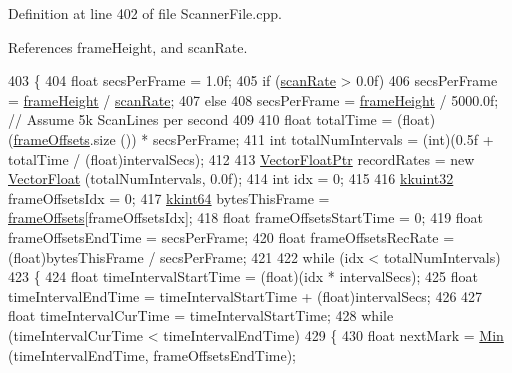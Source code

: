 Definition at line 402 of file Scanner\+File.\+cpp.



References frame\+Height, and scan\+Rate.


\begin{DoxyCode}
403 \{
404   \textcolor{keywordtype}{float}  secsPerFrame = 1.0f;
405   \textcolor{keywordflow}{if}  (\hyperlink{class_k_k_l_s_c_1_1_scanner_file_aaf61fcf404e9dea9adc342bfd520a1f2}{scanRate} > 0.0f)
406     secsPerFrame = \hyperlink{class_k_k_l_s_c_1_1_scanner_file_a5598193d137fb79782cc1967ec830625}{frameHeight}  / \hyperlink{class_k_k_l_s_c_1_1_scanner_file_aaf61fcf404e9dea9adc342bfd520a1f2}{scanRate};
407   \textcolor{keywordflow}{else}
408     secsPerFrame = \hyperlink{class_k_k_l_s_c_1_1_scanner_file_a5598193d137fb79782cc1967ec830625}{frameHeight}  / 5000.0f;  \textcolor{comment}{// Assume 5k ScanLines per second}
409 
410   \textcolor{keywordtype}{float}  totalTime = (float)(\hyperlink{class_k_k_l_s_c_1_1_scanner_file_a61d36c66bb5f16ba82c088cd816b0c68}{frameOffsets}.size ()) * secsPerFrame;
411   \textcolor{keywordtype}{int}  totalNumIntervals = (int)(0.5f + totalTime / (\textcolor{keywordtype}{float})intervalSecs);
412 
413   \hyperlink{namespace_k_k_b_a182835040a03db3c21a7ea4e46c84790}{VectorFloatPtr}  recordRates = \textcolor{keyword}{new} \hyperlink{namespace_k_k_b_a4820c3670ee1fe74f0c4de981c600faf}{VectorFloat} (totalNumIntervals, 0.0f);
414   \textcolor{keywordtype}{int}  idx = 0;
415 
416   \hyperlink{namespace_k_k_b_af8d832f05c54994a1cce25bd5743e19a}{kkuint32} frameOffsetsIdx = 0;
417   \hyperlink{namespace_k_k_b_aa3486b1c5ea9162b3b020c69f72826eb}{kkint64}  bytesThisFrame = \hyperlink{class_k_k_l_s_c_1_1_scanner_file_a61d36c66bb5f16ba82c088cd816b0c68}{frameOffsets}[frameOffsetsIdx];
418   \textcolor{keywordtype}{float}    frameOffsetsStartTime = 0;
419   \textcolor{keywordtype}{float}    frameOffsetsEndTime   = secsPerFrame;
420   \textcolor{keywordtype}{float}    frameOffsetsRecRate = (float)bytesThisFrame / secsPerFrame;
421 
422   \textcolor{keywordflow}{while}  (idx <  totalNumIntervals)
423   \{
424     \textcolor{keywordtype}{float}  timeIntervalStartTime = (float)(idx * intervalSecs);
425     \textcolor{keywordtype}{float}  timeIntervalEndTime   = timeIntervalStartTime + (float)intervalSecs;
426 
427     \textcolor{keywordtype}{float}  timeIntervalCurTime = timeIntervalStartTime;
428     \textcolor{keywordflow}{while}  (timeIntervalCurTime < timeIntervalEndTime)
429     \{
430       \textcolor{keywordtype}{float}  nextMark = \hyperlink{_raster_8cpp_a6261a282d8ed27242c636ad5fb658585}{Min} (timeIntervalEndTime, frameOffsetsEndTime);

\end{DoxyCode}
